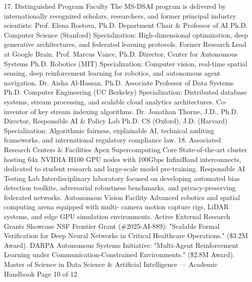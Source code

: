 17. Distinguished Program Faculty
The MS-DSAI program is delivered by internationally recognized scholars, researchers, and former principal industry
scientists:
Prof. Elena Rostova, Ph.D.
Department Chair \& Professor of AI
Ph.D. Computer Science (Stanford)
Specialization: High-dimensional optimization, deep generative
architectures, and federated learning protocols. Former
Research Lead at Google Brain.
Prof. Marcus Vance, Ph.D.
Director, Center for Autonomous Systems
Ph.D. Robotics (MIT)
Specialization: Computer vision, real-time spatial sensing, deep
reinforcement learning for robotics, and autonomous agent
navigation.
Dr. Aisha Al-Hassan, Ph.D.
Associate Professor of Data Systems
Ph.D. Computer Engineering (UC Berkeley)
Specialization: Distributed database systems, stream
processing, and scalable cloud analytics architectures. Co-
inventor of key stream indexing algorithms.
Dr. Jonathan Thorne, J.D., Ph.D.
Director, Responsible AI \& Policy Lab
Ph.D. CS (Oxford), J.D. (Harvard)
Specialization: Algorithmic fairness, explainable AI, technical
auditing frameworks, and international regulatory compliance
law.
18. Associated Research Centers \& Facilities
Apex Supercomputing Core
State-of-the-art cluster hosting 64x
NVIDIA H100 GPU nodes with 100Gbps
InfiniBand interconnects, dedicated to
student research and large-scale model
pre-training.
Responsible AI Testing Lab
Interdisciplinary laboratory focused on
developing automated bias detection
toolkits, adversarial robustness
benchmarks, and privacy-preserving
federated networks.
Autonomous Vision Facility
Advanced robotics and spatial
computing arena equipped with multi-
camera motion capture rigs, LiDAR
systems, and edge GPU simulation
environments.
Active External Research Grants Showcase
NSF Frontier Grant (\#2025-AI-889): "Scalable Formal Verification for Deep Neural Networks in Critical Healthcare
Operations." (\$3.2M Award).
DARPA Autonomous Systems Initiative: "Multi-Agent Reinforcement Learning under Communication-Constrained
Environments." (\$2.8M Award).
Master of Science in Data Science \& Artificial Intelligence — Academic Handbook
Page 10 of 12
